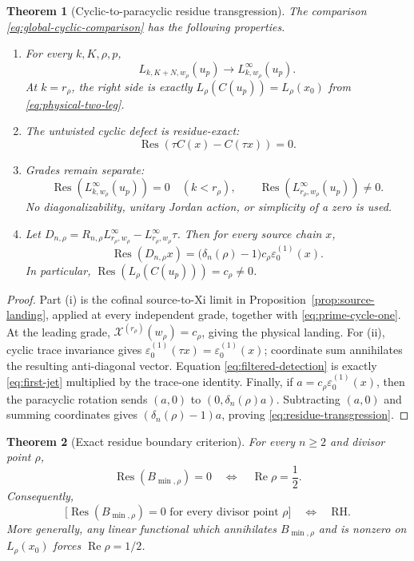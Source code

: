 \documentclass[11pt]{article}
\newtheorem{theorem}{Theorem}[section]
\theoremstyle{definition}
\theoremstyle{remark}
\newcommand{\XiC}{\mathcal X}
\newcommand{\RH}{\mathrm{RH}}
\newcommand{\Rea}{\operatorname{Re}}
\begin{document}
\begin{theorem}[Cyclic-to-paracyclic residue transgression]
\label{thm:residue-transgression}
The comparison \eqref{eq:global-cyclic-comparison} has the following
properties.
\begin{enumerate}[label=\textup{(\roman*)}]
\item For every \(k,K,\rho,p\),
\[
 L_{k,K+N,w_\rho}(u_p)\longrightarrow
 L_{k,w_\rho}^{\infty}(u_p).
\tag{8.5}\label{eq:comparison-limit}
\]
At \(k=r_\rho\), the right side is exactly
\(L_\rho(C(u_p))=L_\rho(x_0)\) from
\eqref{eq:physical-two-leg}.
\item The untwisted cyclic defect is residue-exact:
\[
 \operatorname{Res}\!\left(\tau C(x)-C(\tau x)\right)=0.
\tag{8.6}\label{eq:cyclic-residue-zero}
\]
\item Grades remain separate:
\[
 \operatorname{Res}(L_{k,w_\rho}^{\infty}(u_p))=0
       \quad(k<r_\rho),
 \qquad
 \operatorname{Res}(L_{r_\rho,w_\rho}^{\infty}(u_p))\neq0.
\tag{8.7}\label{eq:filtered-detection}
\]
No diagonalizability, unitary Jordan action, or simplicity of a zero is
used.
\item Let
\(D_{n,\rho}=R_{n,\rho}L_{r_\rho,w_\rho}^{\infty}
-L_{r_\rho,w_\rho}^{\infty}\tau\).  Then for every source chain \(x\),
\[
 \boxed{\quad
 \operatorname{Res}(D_{n,\rho}x)
  =\bigl(\delta_n(\rho)-1\bigr)c_\rho
     \varepsilon_0^{(1)}(x).
 \quad}
\tag{8.8}\label{eq:residue-transgression}
\]
In particular,
\(\operatorname{Res}(L_\rho(C(u_p)))=c_\rho\neq0\).
\end{enumerate}
\end{theorem}

\begin{proof}
Part (i) is the cofinal source-to-Xi limit in
Proposition~\ref{prop:source-landing}, applied at every independent grade,
together with \eqref{eq:prime-cycle-one}.  At the leading grade,
\(\XiC^{(r_\rho)}(w_\rho)=c_\rho\), giving the physical landing.
For (ii), cyclic trace invariance gives
\(\varepsilon_0^{(1)}(\tau x)=\varepsilon_0^{(1)}(x)\); coordinate sum
annihilates the resulting anti-diagonal vector.  Equation
\eqref{eq:filtered-detection} is exactly \eqref{eq:first-jet} multiplied by
the trace-one identity.  Finally, if
\(a=c_\rho\varepsilon_0^{(1)}(x)\), then the paracyclic rotation sends
\((a,0)\) to \((0,\delta_n(\rho)a)\).  Subtracting \((a,0)\) and summing
coordinates gives \((\delta_n(\rho)-1)a\), proving
\eqref{eq:residue-transgression}.
\end{proof}

\begin{theorem}[Exact residue boundary criterion]
\label{thm:residue-boundary-criterion}
For every \(n\geq2\) and divisor point \(\rho\),
\[
 \operatorname{Res}(B_{\min,\rho})=0
 \quad\Longleftrightarrow\quad
 \Rea\rho=\frac12.
\tag{8.9}\label{eq:residue-boundary-iff}
\]
Consequently,
\[
 \bigl[\operatorname{Res}(B_{\min,\rho})=0
       \text{ for every divisor point }\rho\bigr]
 \quad\Longleftrightarrow\quad \RH.
\tag{8.10}\label{eq:global-residue-iff-rh}
\]
More generally, any linear functional which annihilates
\(B_{\min,\rho}\) and is nonzero on \(L_\rho(x_0)\) forces
\(\Rea\rho=1/2\).
\end{theorem}
\end{document}
